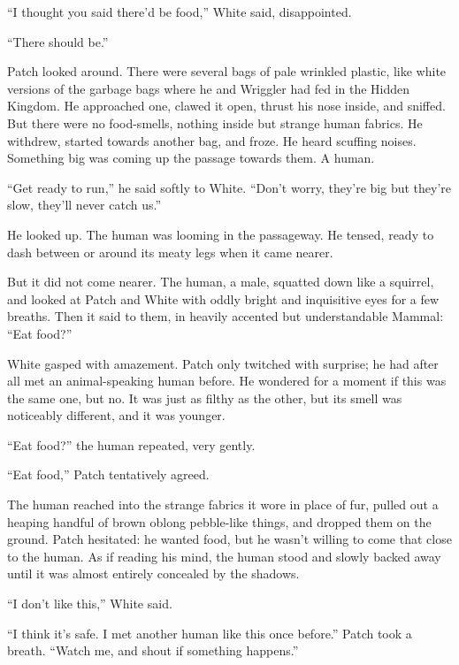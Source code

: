 \documentclass[ebook,oneside,openany,17pt]{memoir}
\newenvironment{tolerant}[1]{%
  \par\tolerance=#1\relax
}{%
  \par
}
\begin{document}
“I thought you said there’d be food,” White said, disappointed.

“There should be.”

\begin{tolerant}{1000}
Patch looked around. There were several bags of pale wrinkled plastic,
like white versions of the garb\-age bags where he and Wriggler had fed
in the Hidden Kingdom. He approached one, clawed it open, thrust his
nose inside, and sniffed. But there were no food-smells, nothing
inside but strange human fabrics. He withdrew, started towards another
bag, and froze. He heard scuffing noises. Something big was coming up
the passage towards them. A human.
\end{tolerant}

\begin{tolerant}{1000}
“Get ready to run,” he said softly to White. “Don’t worry, they’re big
but they’re slow, they’ll never catch us.”
\end{tolerant}

He looked up. The human was looming in the passageway. He tensed,
ready to dash between or around its meaty legs when it came nearer.

But it did not come nearer. The human, a male, squatted down like a
squirrel, and looked at Patch and White with oddly bright and
inquisitive eyes for a few breaths. Then it said to them, in heavily
accented but understandable Mammal: “Eat food?”

\begin{tolerant}{2000}
White gasped with amazement. Patch only twit\-ched with surprise; he had
after all met an animal-speaking human before. He wondered for a
moment if this was the same one, but no. It was just as filthy as the
other, but its smell was noticeably different, and it was younger.
\end{tolerant}

“Eat food?” the human repeated, very gently.

“Eat food,” Patch tentatively agreed.

The human reached into the strange fabrics it wore in place of fur,
pulled out a heaping handful of brown oblong pebble-like things, and
dropped them on the ground. Patch hesitated: he wanted food, but he
wasn’t willing to come that close to the human. As if reading his
mind, the human stood and slowly backed away until it was almost
entirely concealed by the shadows.

“I don’t like this,” White said.

“I think it’s safe. I met another human like this once before.”  Patch
took a breath. “Watch me, and shout if something happens.”
\end{document}
